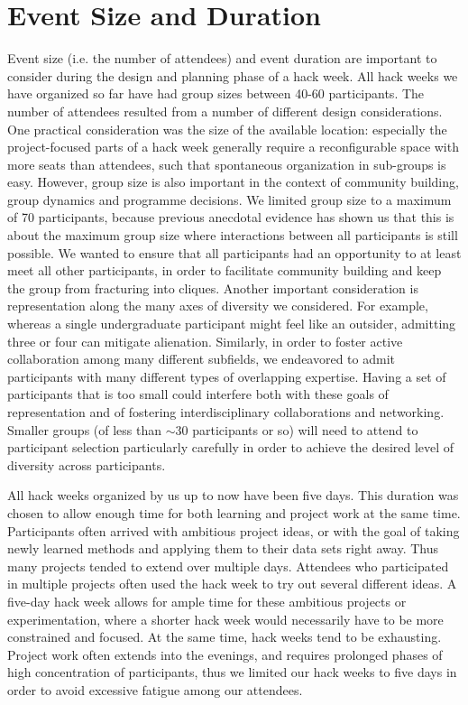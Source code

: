 \documentclass{aastex62}
\begin{document}
\section{Event Size and Duration}

Event size (i.e. the number of attendees) and event duration are important to consider during the design and planning phase of a hack week. All hack weeks we have organized so far have had group sizes between 40-60 participants. The number of attendees resulted from a number of different design considerations. One practical consideration was the size of the available location: especially the project-focused parts of a hack week generally require a reconfigurable space with more seats than attendees, such that spontaneous organization in sub-groups is easy. However, group size is also important in the context of community building, group dynamics and programme decisions. We limited group size to a maximum of 70 participants, because previous anecdotal evidence has shown us that this is about the maximum group size where interactions between all participants is still possible. We wanted to ensure that all participants had an opportunity to at least meet all other participants, in order to facilitate community building and keep the group from fracturing into cliques. Another important consideration is representation along the many axes of diversity we considered. For example, whereas a single undergraduate participant might feel like an outsider, admitting three or four can mitigate alienation. Similarly, in order to foster active collaboration among many different subfields, we endeavored to admit participants with many different types of overlapping expertise. Having a set of participants that is too small could interfere both with these goals of representation and of fostering interdisciplinary collaborations and networking. Smaller groups (of less than $\sim$30 participants or so) will need to attend to participant selection particularly carefully in order to achieve the desired level of diversity across participants. 

All hack weeks organized by us up to now have been five days. This duration was chosen to allow enough time for both learning and project work at the same time. Participants often arrived with ambitious project ideas, or with the goal of taking newly learned methods and applying them to their data sets right away. Thus many projects tended to extend over multiple days. Attendees who participated in multiple projects often used the hack week to try out several different ideas. A five-day hack week allows for ample time for these ambitious projects or experimentation, where a shorter hack week would necessarily have to be more constrained and focused. At the same time, hack weeks tend to be exhausting. Project work often extends into the evenings, and requires prolonged phases of high concentration of participants, thus we limited our hack weeks to five days in order to avoid excessive fatigue among our attendees.
\end{document}
